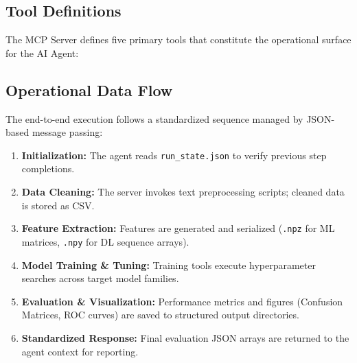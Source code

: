 \documentclass[conference]{IEEEtran}
\begin{document}
\subsection{Tool Definitions}
The MCP Server defines five primary tools that constitute the operational surface for the AI Agent:

\begin{table}[htbp]
\caption{Summary of MCP Server Modular Tool Interfaces.}
\label{tab:mcp_tools}
\centering
{}
\end{table}

\subsection{Operational Data Flow}
The end-to-end execution follows a standardized sequence managed by JSON-based message passing:

\begin{enumerate}
    \item \textbf{Initialization:} The agent reads \texttt{run\_state.json} to verify previous step completions.
    \item \textbf{Data Cleaning:} The server invokes text preprocessing scripts; cleaned data is stored as CSV.
    \item \textbf{Feature Extraction:} Features are generated and serialized (\texttt{.npz} for ML matrices, \texttt{.npy} for DL sequence arrays).
    \item \textbf{Model Training \& Tuning:} Training tools execute hyperparameter searches across target model families.
    \item \textbf{Evaluation \& Visualization:} Performance metrics and figures (Confusion Matrices, ROC curves) are saved to structured output directories.
    \item \textbf{Standardized Response:} Final evaluation JSON arrays are returned to the agent context for reporting.
\end{enumerate}
\end{document}
